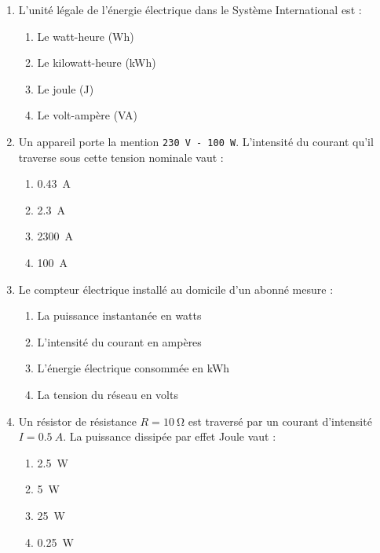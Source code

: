 \documentclass[11pt]{article}
\begin{document}
\begin{exercice}
\begin{enumerate}
    \item L'unité légale de l'énergie électrique dans le Système International est :
    \begin{enumerate}
        \item Le watt-heure (Wh)
        \item Le kilowatt-heure (kWh)
        \item Le joule (J)
        \item Le volt-ampère (VA)
    \end{enumerate}
    \item Un appareil porte la mention \texttt{230 V - 100 W}. L'intensité du courant qu'il traverse sous cette tension nominale vaut :
    \begin{enumerate}
        \item \SI{0,43}{A}
        \item \SI{2,3}{A}
        \item \SI{2300}{A}
        \item \SI{100}{A}
    \end{enumerate}
    \item Le compteur électrique installé au domicile d'un abonné mesure :
    \begin{enumerate}
        \item La puissance instantanée en watts
        \item L'intensité du courant en ampères
        \item L'énergie électrique consommée en kWh
        \item La tension du réseau en volts
    \end{enumerate}
    \item Un résistor de résistance $R = \SI{10}{\ohm}$ est traversé par un courant d'intensité $I = \SI{0,5}{A}$. La puissance dissipée par effet Joule vaut :
    \begin{enumerate}
        \item \SI{2,5}{W}
        \item \SI{5}{W}
        \item \SI{25}{W}
        \item \SI{0,25}{W}
    \end{enumerate}
\end{enumerate}
\end{exercice}
\end{document}
